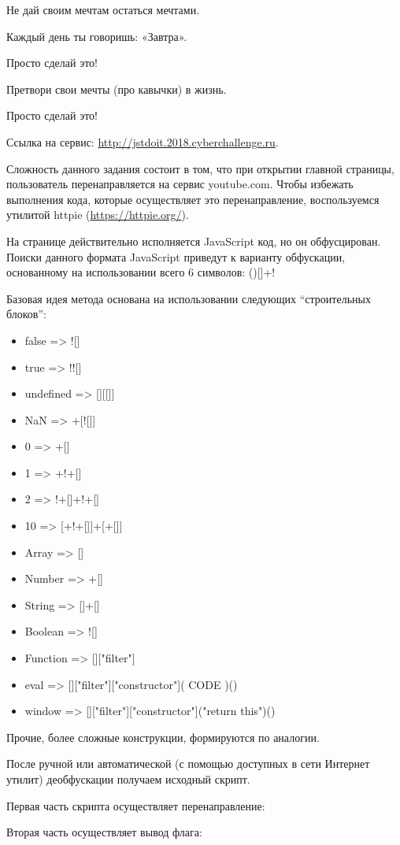 
Не дай своим мечтам остаться мечтами.

Каждый день ты говоришь: «Завтра».

Просто сделай это!

Претвори свои мечты (про кавычки) в жизнь.

Просто сделай это!


Ссылка на сервис: \url{http://jstdoit.2018.cyberchallenge.ru}.

\solutionSection

Сложность данного задания состоит в том, что при открытии главной страницы, пользователь перенаправляется на сервис youtube.com. Чтобы избежать выполнения кода, которые осуществляет это перенаправление, воспользуемся утилитой httpie (\url{https://httpie.org/}).


На странице действительно исполняется JavaScript код, но он обфусцирован. Поиски данного формата JavaScript приведут к варианту обфускации, основанному на использовании всего 6 символов: ()[]+!

Базовая идея метода основана на использовании следующих “строительных блоков”:

\begin{itemize}
    \item false       =>  ![]
    \item true        =>  !![]
    \item undefined   =>  [][[]]
    \item NaN         =>  +[![]]
    \item 0           =>  +[]
    \item 1           =>  +!+[]
    \item 2           =>  !+[]+!+[]
    \item 10          =>  [+!+[]]+[+[]]
    \item Array       =>  []
    \item Number      =>  +[]
    \item String      =>  []+[]
    \item Boolean     =>  ![]
    \item Function    =>  []["filter"]
    \item eval        =>  []["filter"]["constructor"]( CODE )()
    \item window      =>  []["filter"]["constructor"]("return this")()
\end{itemize}

Прочие, более сложные конструкции, формируются по аналогии.

После ручной или автоматической (с помощью доступных в сети Интернет утилит) деобфускации получаем исходный скрипт.

Первая часть скрипта осуществляет перенаправление:


Вторая часть осуществляет вывод флага:


